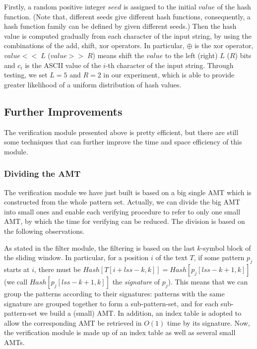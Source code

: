 \documentclass{article}
\begin{document}
Firstly, a random positive integer $seed$ is assigned to the initial
$value$ of the hash function. (Note that, different seeds give
different hash functions, consequently, a hash function family can be
defined by given different seeds.) Then the hash value is computed
gradually from each character of the input string, by using the
combinations of the \textsf{add, shift, xor} operators. In particular,
$\oplus$ is the \textsf{xor} operator, $value << \;L$ ($value >> \;R$)
means shift the $value$ to the left (right) $L$ ($R$) bits and $c_i$
is the ASCII value of the $i$-th character of the input
string. Through testing, we set $L=5$ and $R=2$ in our experiment,
which is able to provide greater likelihood of a uniform distribution
of hash values.

\subsection{Further Improvements}
\label{sec:further improments}

The verification module presented above is pretty efficient, but there
are still some techniques that can further improve the time and space
efficiency of this module.

\subsubsection{Dividing the AMT}
\label{sec:divide amt}

The verification module we have just built is based on a big single
AMT which is constructed from the whole pattern set. Actually, we can
divide the big AMT into small ones and enable each verifying procedure
to refer to only one small AMT, by which the time for verifying can be
reduced. The division is based on the following observations.

As stated in the filter module, the filtering is based on the last
$k$-symbol block of the sliding window. In particular, for a position
$i$ of the text $T$, if some pattern $p_j$ starts at $i$, there must
be $Hash[T[i+lss-k,k]] = Hash[p_j[lss-k+1,k]]$ (we call
$Hash[p_j[lss-k+1,k]]$ the \emph{signature} of $p_j$). This means that
we can group the patterns according to their signatures: patterns with
the same signature are grouped together to form a sub-pattern-set, and
for each sub-pattern-set we build a (small) AMT. In addition, an index
table is adopted to allow the corresponding AMT be retrieved in $O(1)$
time by its signature. Now, the verification module is made up of an
index table as well as several small AMTs.
\end{document}
